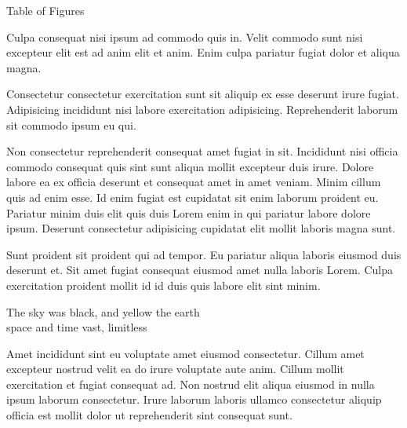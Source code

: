 \mktsRuleSwell{}

\vspace{\myLineheight}\begin{multicols}{2}\raggedcolumns{}




\end{multicols}


{\mktsHTwo{}Table of Figures\mktsHTwoBeg}%


\vspace{\myLineheight}\begin{multicols}{2}\raggedcolumns{}Culpa consequat nisi ipsum ad commodo quis in. Velit commodo sunt nisi excepteur elit est ad anim elit et anim. Enim culpa pariatur fugiat dolor et aliqua magna.

Consectetur consectetur exercitation sunt sit aliquip ex esse deserunt irure fugiat. Adipisicing incididunt nisi labore exercitation adipisicing. Reprehenderit laborum sit commodo ipsum eu qui.

Non consectetur reprehenderit consequat amet fugiat in sit. Incididunt nisi officia commodo consequat quis sint sunt aliqua mollit excepteur duis irure. Dolore labore ea ex officia deserunt et consequat amet in amet veniam. Minim cillum quis ad enim esse. Id enim fugiat est cupidatat sit enim laborum proident eu. Pariatur minim duis elit quis duis Lorem enim in qui pariatur labore dolore ipsum. Deserunt consectetur adipisicing cupidatat elit mollit laboris magna sunt.

Sunt proident sit proident qui ad tempor. Eu pariatur aliqua laboris eiusmod duis deserunt et. Sit amet fugiat consequat eiusmod amet nulla laboris Lorem. Culpa exercitation proident mollit id id duis quis labore elit sint minim.



\end{multicols}


{\mktsHOne{}\cjkgGlue{} The sky was black, and yellow the earth\\\cjkgGlue{} space and time vast, limitless\mktsHOneBeg}%


\vspace{\myLineheight}\begin{multicols}{2}\raggedcolumns{}Amet incididunt sint eu voluptate amet eiusmod consectetur. Cillum amet excepteur nostrud velit ea do irure voluptate aute anim. Cillum mollit exercitation et fugiat consequat ad. Non nostrud elit aliqua eiusmod in nulla ipsum laborum consectetur. Irure laborum laboris ullamco consectetur aliquip officia est mollit dolor ut reprehenderit sint consequat sunt.



\end{multicols}


